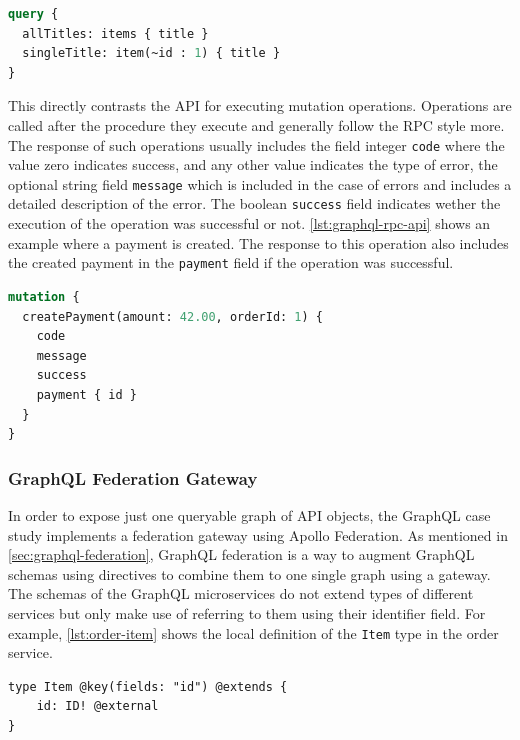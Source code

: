 \begin{lstlisting}[caption={Query to Obtain Resources of the GraphQL \ac{API}}, language=graphql, label={lst:graphql-res-api}]
query {
  allTitles: items { title }
  singleTitle: item(~id : 1) { title }
}
\end{lstlisting}

This directly contrasts the \ac{API} for executing mutation operations.
Operations are called after the procedure they execute and generally follow the \ac{RPC} style more.
The response of such operations usually includes the field integer \texttt{code} where the value zero indicates success, and any other value indicates the type of error, the optional string field \texttt{message} which is included in the case of errors and includes a detailed description of the error.
The boolean \texttt{success} field indicates wether the execution of the operation was successful or not.
\autoref{lst:graphql-rpc-api} shows an example where a payment is created.
The response to this operation also includes the created payment in the \texttt{payment} field if the operation was successful.

\begin{lstlisting}[caption={Mutation to Create a Payment in the GraphQL \ac{API}}, language=graphql, label={lst:graphql-rpc-api}]
mutation {
  createPayment(amount: 42.00, orderId: 1) {
    code
    message
    success
    payment { id }
  }
}
\end{lstlisting}

\subsubsection{GraphQL Federation Gateway}

In order to expose just one queryable graph of \ac{API} objects, the GraphQL case study implements a federation gateway using Apollo Federation.
As mentioned in \autoref{sec:graphql-federation}, GraphQL federation is a way to augment GraphQL schemas using directives to combine them to one single graph using a gateway.
The schemas of the GraphQL microservices do not extend types of different services but only make use of referring to them using their identifier field.
For example, \autoref{lst:order-item} shows the local definition of the \texttt{Item} type in the order service.

\begin{lstlisting}[caption={Schema Definition to Enable Federation}, language=graphqls, label={lst:order-item}]
type Item @key(fields: "id") @extends {
    id: ID! @external
}
\end{lstlisting}

